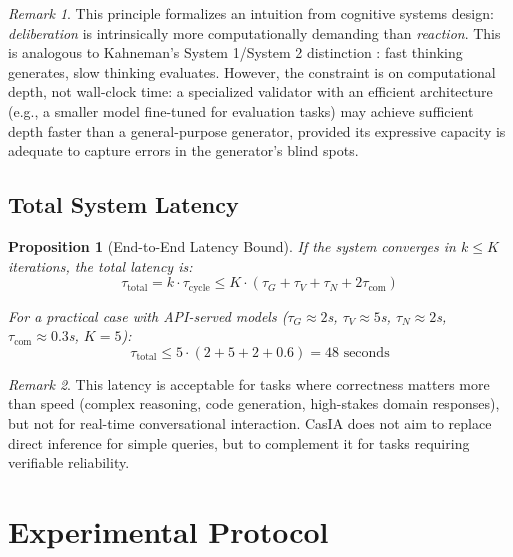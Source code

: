 \documentclass[11pt,a4paper]{article}
\newtheorem{proposition}{Proposition}[section]
\theoremstyle{remark}
\newtheorem{remark}{Remark}[section]
\begin{document}
\begin{remark}
\label{rem:asymmetry}
This principle formalizes an intuition from cognitive systems design: \emph{deliberation} is intrinsically more computationally demanding than \emph{reaction}. This is analogous to Kahneman's System 1/System 2 distinction \cite{kahneman2011thinking}: fast thinking generates, slow thinking evaluates. However, the constraint is on computational depth, not wall-clock time: a specialized validator with an efficient architecture (e.g., a smaller model fine-tuned for evaluation tasks) may achieve sufficient depth faster than a general-purpose generator, provided its expressive capacity is adequate to capture errors in the generator's blind spots.
\end{remark}

\subsection{Total System Latency}

\begin{proposition}[End-to-End Latency Bound]
\label{prop:total_latency}
If the system converges in $k \leq K$ iterations, the total latency is:
\begin{equation}
  \tau_{\text{total}} = k \cdot \tau_{\text{cycle}} \leq K \cdot (\tau_G + \tau_V + \tau_N + 2\tau_{\text{com}})
\end{equation}

For a practical case with API-served models ($\tau_G \approx 2$s, $\tau_V \approx 5$s, $\tau_N \approx 2$s, $\tau_{\text{com}} \approx 0.3$s, $K = 5$):
\begin{equation}
  \tau_{\text{total}} \leq 5 \cdot (2 + 5 + 2 + 0.6) = 48 \text{ seconds}
\end{equation}
\end{proposition}

\begin{remark}
This latency is acceptable for tasks where correctness matters more than speed (complex reasoning, code generation, high-stakes domain responses), but not for real-time conversational interaction. CasIA does not aim to replace direct inference for simple queries, but to complement it for tasks requiring verifiable reliability.
\end{remark}

\section{Experimental Protocol}
\label{sec:experiments}
\end{document}
